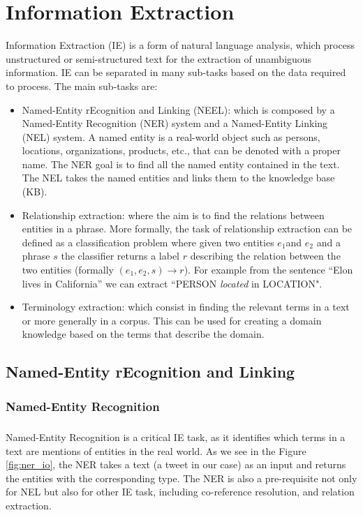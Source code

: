 \chapter{Information Extraction}
Information Extraction (IE) is a form of natural language analysis, which process unstructured or semi-structured text for the extraction of unambiguous information. IE can be separated in many sub-tasks based on the data required to process. The main sub-tasks are:

\begin{itemize}[itemsep = 0.1em]
\item Named-Entity rEcognition and Linking (NEEL): which is composed by a Named-Entity Recognition (NER) system and a Named-Entity Linking (NEL) system. A named entity is a real-world object such as persons, locations, organizations, products, etc., that can be denoted with a proper name. The NER goal is to find all the named entity contained in the text. The NEL takes the named entities and links them to the knowledge base (KB).

\item Relationship extraction: where the aim is to find the relations between entities in a phrase. More formally, the task of relationship extraction can be defined as a classification problem where given two entities \(e_1\)and \(e_2\) and a phrase \(s\) the classifier returns a label \(r\) describing the relation between the two entities (formally \((e_1, e_2, s)\rightarrow r\)). For example from the sentence ``Elon lives in California'' we can extract ``PERSON \textit{located} in LOCATION".

\item Terminology extraction: which consist in finding the relevant terms in a text or more generally in a corpus. This can be used for creating a domain knowledge based on the terms that describe the domain.
\end{itemize}

\section{Named-Entity rEcognition and Linking}

\subsection{Named-Entity Recognition}
\paragraph{}
Named-Entity Recognition is a critical IE task, as it identifies which terms in a text are mentions of entities in the real world.
As we see in the Figure \ref{fig:ner_io}, the NER takes a text (a tweet in our case) as an input and returns the entities with the corresponding type. The NER is also a pre-requisite not only for NEL but also for other IE task, including co-reference resolution, and relation extraction.

